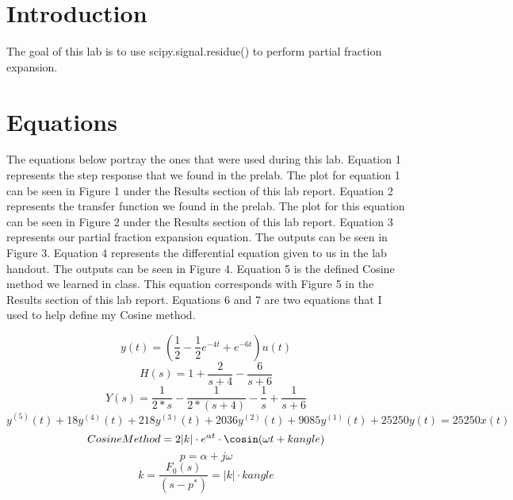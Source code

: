 \documentclass[12pt]{report}
\begin{document}
\section{Introduction}
 

The goal of this lab is to use scipy.signal.residue() to perform partial fraction expansion.

\section{Equations}

The equations below portray the ones that were used during this lab. Equation 1 represents the step response that we found in the prelab. The plot for equation 1 can be seen in Figure 1 under the Results section of this lab report. Equation 2 represents the transfer function we found in the prelab. The plot for this equation can be seen in Figure 2 under the Results section of this lab report. Equation 3 represents our partial fraction expansion equation. The outputs can be seen in Figure 3. Equation 4 represents the differential equation given to us in the lab handout. The outputs can be seen in Figure 4. Equation 5 is the defined Cosine method we learned in class. This equation corresponds with Figure 5 in the Results section of this lab report. Equations 6 and 7 are two equations that I used to help define my Cosine method.  

\begin{equation}
    y(t) = (\frac{1}{2}-\frac{1}{2} e^{-4t}+e^{-6t})u(t)
\end{equation}
\begin{equation}
    H(s) = 1+\frac{2}{s+4}-\frac{6}{s+6}
\end{equation}
\begin{equation}
   Y(s) = \frac{1}{2*s}-\frac{1}{2*(s+4)}-\frac{1}{s}+\frac{1}{s+6}
\end{equation}
\begin{equation}
   y^{(5)}(t) + 18y^{(4)}(t) + 218y^{(3)}(t) + 2036y^{(2)}(t) + 9085y^{(1)}(t) + 25250y(t) = 25250x(t)
\end{equation}
\begin{equation}
   Cosine Method = 2|k|\cdot e^{\alpha t} \cdot \cosin({\omega t + kangle})
\end{equation}
\begin{equation}
    p=\alpha + j\omega
\end{equation}
\begin{equation}
    k=\frac{F_{0}(s)}{(s-p^{*})} = |k|\cdot kangle
\end{equation}
\end{document}
